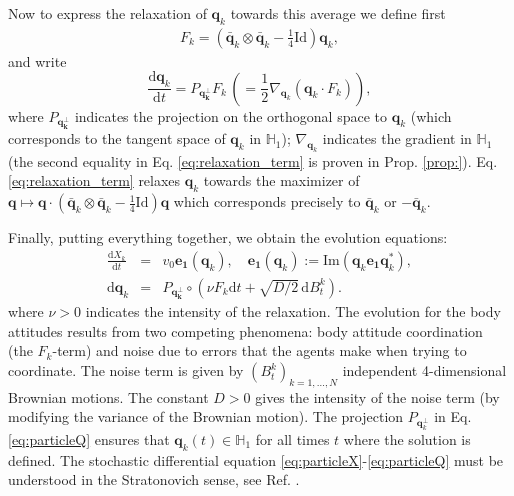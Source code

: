 \documentclass[12pt]{article}
\newcommand{\beqarl}{\begin{eqnarray}}
\newcommand{\eeqarl}{\end{eqnarray}}
\newcommand{\lp}{\left(}
\newcommand{\rp}{\right)}
\newcommand{\be}{\begin{equation}}
\newcommand{\ee}{\end{equation}}
\newcommand{\vezero}{\mathbf{e_{1}}}
\newcommand{\Id}{\mathrm{Id}}
\newcommand{\ud}{\mathrm{d}}
\newcommand{\unitq}{{\mathbb{H}_1}}
\newcommand{\Ima}{\mbox{Im}}
\newcommand{\q}{\mathbf{q}}
\newcommand{\qk}{\mathbf{q}_k}
\newcommand{\bqk}{\bar{\mathbf{q}}_k}
\begin{document}
\medskip
Now to express the relaxation of $\q_k$ towards this average we define first
\beqarl \label{eq:definition F_k}
F_k =  \left(\bqk \otimes \bqk - \frac{1}{4} \Id\right) \qk,
\eeqarl
and write
\be \label{eq:relaxation_term}
\frac{\ud\qk}{\ud t} = P_{\mathbf{q}_\mathbf{k}^\perp}F_k\, \lp =\frac{1}{2}\nabla_{\qk}\lp\qk \cdot F_k \rp \rp,
\ee
where $P_{\mathbf{q}_\mathbf{k}^\perp}$ indicates the projection on the orthogonal space to $\qk$   (which corresponds to the tangent space of $\qk$ in $\unitq$); $\nabla_{\qk}$ indicates the gradient in $\unitq$ (the second equality in Eq. \eqref{eq:relaxation_term} is proven in Prop. \ref{prop:}). Eq. \eqref{eq:relaxation_term} relaxes $\qk$ towards the maximizer of $\q\mapsto \q \cdot\left(\bqk \otimes \bqk - \frac{1}{4} \Id\right)\q$ which corresponds precisely to $\bqk$ or $-\bqk$.


\medskip





Finally, putting everything together, we obtain the evolution equations:
\beqarl \label{eq:particleX}
\frac{\ud X_k}{\ud t} &=& v_0 \vezero(\qk), \quad \vezero(\qk):= \Ima(\qk \vezero \qk^*),\\
\ud\qk &=& P_{\mathbf{q}_\mathbf{k}^\perp} \circ \lp\nu F_k \ud t+ \sqrt{D/2}\,\ud B_t^k \rp. \label{eq:particleQ}
\eeqarl
where $\nu>0$ indicates the intensity of the relaxation.
The evolution for the body attitudes results from two competing phenomena: body attitude coordination (the $F_k$-term) and noise due to errors that the agents make when trying to coordinate. The noise term is given by $(B_t^k)_{k=1,\hdots,N}$ independent 4-dimensional Brownian motions. The constant $D>0$ gives the intensity of the noise term (by modifying the variance of the Brownian motion). The projection $P_{\qk^\perp}$ in Eq. \eqref{eq:particleQ} ensures that $\qk(t)\in \unitq$ for all times $t$ where the solution is defined. The stochastic differential equation \eqref{eq:particleX}-\eqref{eq:particleQ} must be understood in the Stratonovich sense, see Ref. \cite{hsu2002stochastic}.
 
\end{document}
